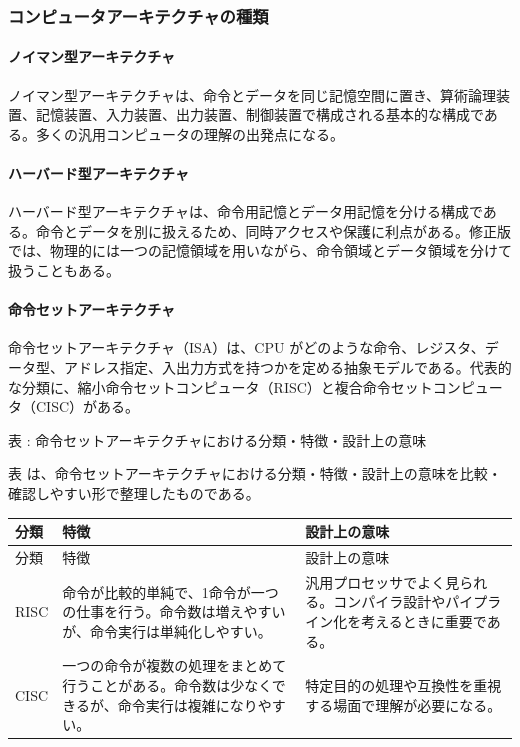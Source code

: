 \subsubsection{コンピュータアーキテクチャの種類}

\paragraph{ノイマン型アーキテクチャ}

ノイマン型アーキテクチャは、命令とデータを同じ記憶空間に置き、算術論理装置、記憶装置、入力装置、出力装置、制御装置で構成される基本的な構成である。多くの汎用コンピュータの理解の出発点になる。

\paragraph{ハーバード型アーキテクチャ}

ハーバード型アーキテクチャは、命令用記憶とデータ用記憶を分ける構成である。命令とデータを別に扱えるため、同時アクセスや保護に利点がある。修正版では、物理的には一つの記憶領域を用いながら、命令領域とデータ領域を分けて扱うこともある。

\paragraph{命令セットアーキテクチャ}

命令セットアーキテクチャ（ISA）は、CPU がどのような命令、レジスタ、データ型、アドレス指定、入出力方式を持つかを定める抽象モデルである。代表的な分類に、縮小命令セットコンピュータ（RISC）と複合命令セットコンピュータ（CISC）がある。

\par\smallskip\noindent{}\label{tab:ch16-04}表 \thetable: 命令セットアーキテクチャにおける分類・特徴・設計上の意味\par\smallskip
表 \thetable は、命令セットアーキテクチャにおける分類・特徴・設計上の意味を比較・確認しやすい形で整理したものである。\par\smallskip
\begin{longtable}{>{\raggedright\arraybackslash}p{}>{\raggedright\arraybackslash}p{}>{\raggedright\arraybackslash}p{}}
\toprule
分類 & 特徴 & 設計上の意味 \\
\midrule
\endfirsthead
\toprule
分類 & 特徴 & 設計上の意味 \\
\midrule
\endhead
RISC & 命令が比較的単純で、1命令が一つの仕事を行う。命令数は増えやすいが、命令実行は単純化しやすい。 & 汎用プロセッサでよく見られる。コンパイラ設計やパイプライン化を考えるときに重要である。 \\
CISC & 一つの命令が複数の処理をまとめて行うことがある。命令数は少なくできるが、命令実行は複雑になりやすい。 & 特定目的の処理や互換性を重視する場面で理解が必要になる。 \\
\bottomrule
\end{longtable}

